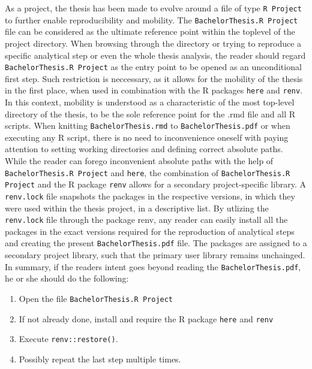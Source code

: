 \documentclass[
  12pt,
]{article}
\begin{document}
\begin{Center}
\begin{justify}
As a project, the thesis has been made to evolve around a file of type \texttt{R Project} to further enable reproducibility and mobility. The \texttt{BachelorThesis.R Project} file can be considered as the ultimate reference point within the toplevel of the project directory. When browsing through the directory or trying to reproduce a specific analytical step or even the whole thesis analysis, the reader should regard \texttt{BachelorThesis.R Project} as the entry point to be opened as an unconditional first step. Such restriction is neccessary, as it allows for the mobility of the thesis in the first place, when used in combination with the R packages \texttt{here} and \texttt{renv}. In this context, mobility is understood as a characteristic of the most top-level directory of the thesis, to be the sole reference point for the .rmd file and all R scripts. When knitting \texttt{BachelorThesis.rmd} to \texttt{BachelorThesis.pdf} or when executing any R script, there is no need to inconvenience oneself with paying attention to setting working directories and defining correct absolute paths.\newline
While the reader can forego inconvenient absolute paths with the help of \texttt{BachelorThesis.R Project} and \texttt{here}, the combination of \texttt{BachelorThesis.R Project} and the R package \texttt{renv} allows for a secondary project-specific library. A \texttt{renv.lock} file snapshots the packages in the respective versions, in which they were used within the thesis project, in a descriptive list. 
By utlizing the \texttt{renv.lock} file through the package renv, any reader can easily install all the packages in the exact versions required for the reproduction of analytical steps and creating the present \texttt{BachelorThesis.pdf} file. The packages are assigned to a secondary project library, such that the primary user library remains unchainged.\newline
In summary, if the readers intent goes beyond reading the \texttt{BachelorThesis.pdf}, he or she should do the following:\newline
\vspace{-0.5cm}
\begin{enumerate}
\item Open the file \texttt{BachelorThesis.R Project}
\item If not already done, install and require the R package \texttt{here} and \texttt{renv}
\item Execute \texttt{renv::restore()}.
\item Possibly repeat the last step multiple times.

\end{enumerate}
\end{justify}
\end{Center}
\end{document}
